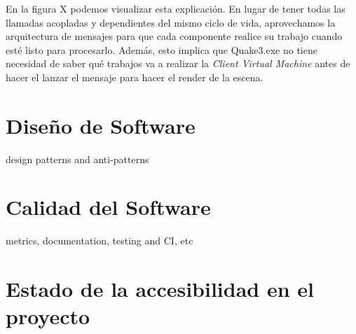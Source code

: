 \documentclass[a4paper,12pt]{report}
\begin{document}
    En la figura X podemos visualizar esta explicación. En lugar de tener todas las llamadas acopladas y dependientes del mismo ciclo de vida, aprovechamos la arquitectura de mensajes para que cada componente realice su trabajo cuando esté listo para procesarlo. Además, esto implica que Quake3.exe no tiene necesidad de saber qué trabajos va a realizar la \textit{Client Virtual Machine} antes de hacer el lanzar el mensaje para hacer el render de la escena.\\
    
    
    
	
	
	
	\newpage
	\section{Diseño de Software}
	design patterns and anti-patterns\\
	
	\section{Calidad del Software}
	metrics, documentation, testing and CI, etc\\
	
	\section{Estado de la accesibilidad en el proyecto}
	
\end{document}
